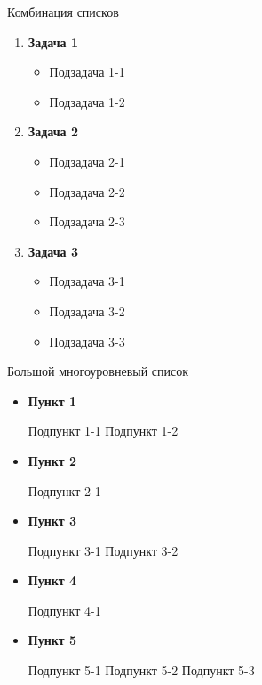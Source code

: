 \begin{frame}{Комбинация списков}
  \begin{enumerate}
    \item \textbf{Задача 1}
      \begin{itemize}
        \item Подзадача 1-1
        \item Подзадача 1-2
      \end{itemize}
    \item \textbf{Задача 2}
      \begin{itemize}
        \item Подзадача 2-1
        \item Подзадача 2-2
        \item Подзадача 2-3
      \end{itemize}
    \item \textbf{Задача 3}
      \begin{itemize}
        \item Подзадача 3-1
        \item Подзадача 3-2
        \item Подзадача 3-3
      \end{itemize}
  \end{enumerate}
\end{frame}

\begin{frame}{Большой многоуровневый список}
  \begin{itemize}
    \item \textbf{Пункт 1}
    \begin{itemize}
      \itemi Подпункт 1-1
      \itemi Подпункт 1-2
    \end{itemize}
    \item \textbf{Пункт 2}
    \begin{itemize}
      \itemi Подпункт 2-1
    \end{itemize}
    \item \textbf{Пункт 3}
    \begin{itemize}
      \itemi Подпункт 3-1
      \itemi Подпункт 3-2
    \end{itemize}
    \item \textbf{Пункт 4}
    \begin{itemize}
      \itemi Подпункт 4-1
    \end{itemize}
    \item \textbf{Пункт 5}
    \begin{itemize}
      \pro Подпункт 5-1
      \pro Подпункт 5-2
      \con Подпункт 5-3
    \end{itemize}
  \end{itemize}
\end{frame}

